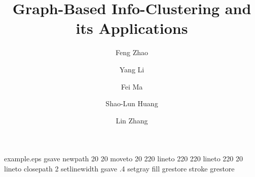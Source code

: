 %
%
%
%
\begin{filecontents*}{example.eps}
gsave
newpath
  20 20 moveto
  20 220 lineto
  220 220 lineto
  220 20 lineto
closepath
2 setlinewidth
gsave
  .4 setgray fill
grestore
stroke
grestore
\end{filecontents*}
%
\RequirePackage{fix-cm}
%
\documentclass[smallcondensed]{svjour3}       %
%
\smartqed  %
%
\usepackage{graphicx}
\usepackage{amsmath}
\usepackage{amssymb}
\usepackage{natbib}
\usepackage{bm}
\usepackage{url}
\usepackage{subcaption}
\captionsetup{compatibility=false}

%
%
%
%
%


\title{Graph-Based Info-Clustering and its Applications%
}


\author{Feng Zhao         \and
        Yang Li \and %
        Fei Ma \and
        Shao-Lun Huang \and
        Lin Zhang
}

